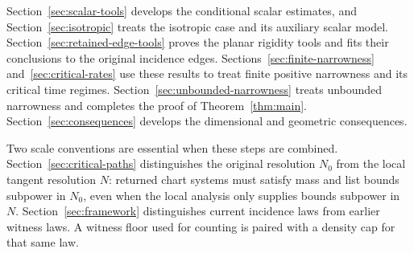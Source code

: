 Section~\ref{sec:scalar-tools} develops the conditional scalar
estimates, and Section~\ref{sec:isotropic} treats the isotropic
case and its auxiliary scalar model.
Section~\ref{sec:retained-edge-tools} proves the planar rigidity
tools and fits their conclusions to the original incidence edges.
Sections~\ref{sec:finite-narrowness} and~\ref{sec:critical-rates}
use these results to treat finite positive narrowness and its
critical time regimes.
Section~\ref{sec:unbounded-narrowness} treats unbounded narrowness
and completes the proof of Theorem~\ref{thm:main}.
Section~\ref{sec:consequences} develops the dimensional and geometric
consequences.

Two scale conventions are essential when these steps are combined.
Section~\ref{sec:critical-paths} distinguishes the original resolution
\(N_0\) from the local tangent resolution \(N\): returned chart
systems must satisfy mass and list bounds subpower in \(N_0\), even
when the local analysis only supplies bounds subpower in \(N\).
Section~\ref{sec:framework} distinguishes current incidence laws
from earlier witness laws. A witness floor used for counting is
paired with a density cap for that same law.
